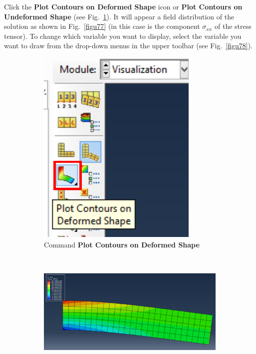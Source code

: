 \begin{enumerate}
  Click the \textbf{Plot Contours on Deformed Shape} icon or
  \textbf{Plot Contours on Undeformed Shape} (see
  Fig.~\ref{figu76}). It will appear a field distribution of
  the solution as shown in Fig.~\ref{figu77} (in this case is the
  component $\sigma_ {xx}$ of the stress tensor). To change which
  variable you want to display, select the variable you want to draw
  from the drop-down menus in the upper toolbar (see
  Fig.~\ref{figu78}).
  \begin{figure}[H]
    \centering
    \begin{subfigure}{0.19\textwidth}
      \includegraphics[width=\textwidth]{./body/images/imagen76.pdf}
      \caption{Command \textbf{Plot Contours on Deformed Shape}}
      \label{figu76}
    \end{subfigure}%
    ~ %
    \begin{subfigure}{0.44\textwidth}
      \includegraphics[width=\textwidth]{./body/images/imagen77}

\end{subfigure}
\end{figure}
\end{enumerate}
